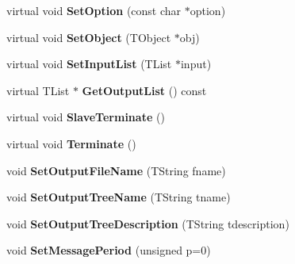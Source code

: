\begin{DoxyCompactItemize}
\item 
\hypertarget{class_h_a_l_1_1_analysis_selector_a8e8f2ff599b95b4ea1437080f7a243e2}{virtual void {\bfseries Set\-Option} (const char $\ast$option)}\label{class_h_a_l_1_1_analysis_selector_a8e8f2ff599b95b4ea1437080f7a243e2}

\item 
\hypertarget{class_h_a_l_1_1_analysis_selector_a6c5b330612cbb40740a1773322f1bd4c}{virtual void {\bfseries Set\-Object} (T\-Object $\ast$obj)}\label{class_h_a_l_1_1_analysis_selector_a6c5b330612cbb40740a1773322f1bd4c}

\item 
\hypertarget{class_h_a_l_1_1_analysis_selector_a2ad21fe9c786a8b8ed9d2f2ed03b18dd}{virtual void {\bfseries Set\-Input\-List} (T\-List $\ast$input)}\label{class_h_a_l_1_1_analysis_selector_a2ad21fe9c786a8b8ed9d2f2ed03b18dd}

\item 
\hypertarget{class_h_a_l_1_1_analysis_selector_af839fdbf6d731039f3dfe2a28435cfa0}{virtual T\-List $\ast$ {\bfseries Get\-Output\-List} () const }\label{class_h_a_l_1_1_analysis_selector_af839fdbf6d731039f3dfe2a28435cfa0}

\item 
\hypertarget{class_h_a_l_1_1_analysis_selector_a83767cc68a8016682064a673b4cd3a81}{virtual void {\bfseries Slave\-Terminate} ()}\label{class_h_a_l_1_1_analysis_selector_a83767cc68a8016682064a673b4cd3a81}

\item 
\hypertarget{class_h_a_l_1_1_analysis_selector_a8b660b6a333cdefd12e1829389fbf0cd}{virtual void {\bfseries Terminate} ()}\label{class_h_a_l_1_1_analysis_selector_a8b660b6a333cdefd12e1829389fbf0cd}

\item 
\hypertarget{class_h_a_l_1_1_analysis_selector_a65b63a6f47a198031436edbea7818b1b}{void {\bfseries Set\-Output\-File\-Name} (T\-String fname)}\label{class_h_a_l_1_1_analysis_selector_a65b63a6f47a198031436edbea7818b1b}

\item 
\hypertarget{class_h_a_l_1_1_analysis_selector_a03cb0fb32fb595a20183a10651811a10}{void {\bfseries Set\-Output\-Tree\-Name} (T\-String tname)}\label{class_h_a_l_1_1_analysis_selector_a03cb0fb32fb595a20183a10651811a10}

\item 
\hypertarget{class_h_a_l_1_1_analysis_selector_ab1610526942d045e9bc1b2e4006575a5}{void {\bfseries Set\-Output\-Tree\-Description} (T\-String tdescription)}\label{class_h_a_l_1_1_analysis_selector_ab1610526942d045e9bc1b2e4006575a5}

\item 
\hypertarget{class_h_a_l_1_1_analysis_selector_a1e12ce6668b8f66ee0590dab7d9a6904}{void {\bfseries Set\-Message\-Period} (unsigned p=0)}\label{class_h_a_l_1_1_analysis_selector_a1e12ce6668b8f66ee0590dab7d9a6904}

\end{DoxyCompactItemize}
